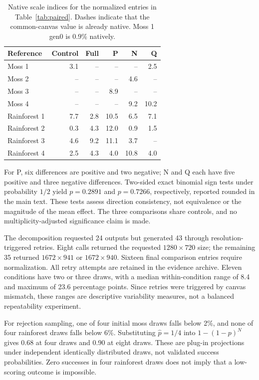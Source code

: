 \documentclass[sigplan,10pt,nonacm]{acmart}
\begin{document}
\begin{table}[t]
\caption{Native scale indices for the normalized entries in Table~\ref{tab:paired}. Dashes indicate that the common-canvas value is already native. Moss 1 gen0 is 0.9\% natively.}
\label{tab:native}
\centering\small
\begin{tabular}{lrrrrr}
\toprule
Reference & Control & Full & P & N & Q \\
\midrule
Moss 1 & 3.1 & -- & -- & -- & 2.5 \\
Moss 2 & -- & -- & -- & 4.6 & -- \\
Moss 3 & -- & -- & 8.9 & -- & -- \\
Moss 4 & -- & -- & -- & 9.2 & 10.2 \\
Rainforest 1 & 7.7 & 2.8 & 10.5 & 6.5 & 7.1 \\
Rainforest 2 & 0.3 & 4.3 & 12.0 & 0.9 & 1.5 \\
Rainforest 3 & 4.6 & 9.2 & 11.1 & 3.7 & -- \\
Rainforest 4 & 2.5 & 4.3 & 4.0 & 10.8 & 4.0 \\
\bottomrule
\end{tabular}
\end{table}

For P, six differences are positive and two negative; N and Q each have five positive and three negative differences. Two-sided exact binomial sign tests under probability $1/2$ yield $p=0.2891$ and $p=0.7266$, respectively, reported rounded in the main text. These tests assess direction consistency, not equivalence or the magnitude of the mean effect. The three comparisons share controls, and no multiplicity-adjusted significance claim is made.

The decomposition requested 24 outputs but generated 43 through resolution-triggered retries. Eight calls returned the requested $1280\times720$ size; the remaining 35 returned $1672\times941$ or $1672\times940$. Sixteen final comparison entries require normalization. All retry attempts are retained in the evidence archive. Eleven conditions have two or three draws, with a median within-condition range of 8.4 and maximum of 23.6 percentage points. Since retries were triggered by canvas mismatch, these ranges are descriptive variability measures, not a balanced repeatability experiment.

For rejection sampling, one of four initial moss draws falls below 2\%, and none of four rainforest draws falls below 6\%. Substituting $\hat p=1/4$ into $1-(1-p)^N$ gives 0.68 at four draws and 0.90 at eight draws. These are plug-in projections under independent identically distributed draws, not validated success probabilities. Zero successes in four rainforest draws does not imply that a low-scoring outcome is impossible.
\end{document}
